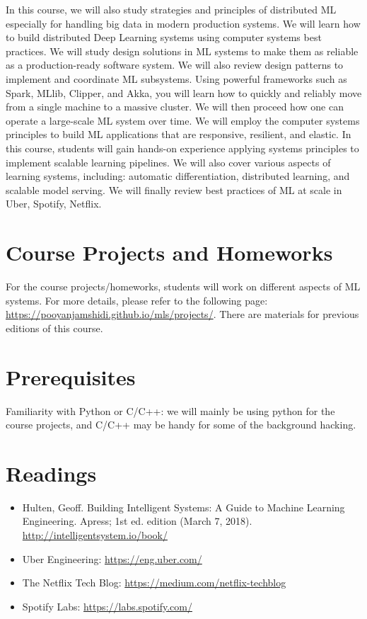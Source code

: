 \documentclass[11pt]{article}
\begin{document}
In this course, we will also study strategies and principles of distributed ML especially for handling big data in modern production systems. We will learn how to build distributed Deep Learning systems using computer systems best practices. We will study design solutions in ML systems to make them as reliable as a production-ready software system. We will also review design patterns to implement and coordinate ML subsystems. Using powerful frameworks such as Spark, MLlib, Clipper, and Akka, you will learn how to quickly and reliably move from a single machine to a massive cluster. We will then proceed how one can operate a large-scale ML system over time. We will employ the computer systems principles to build ML applications that are responsive, resilient, and elastic. In this course, students will gain hands-on experience applying systems principles to implement scalable learning pipelines. We will also cover various aspects of learning systems, including: automatic differentiation, distributed learning, and scalable model serving. We will finally review best practices of ML at scale in Uber, Spotify, Netflix. 


\section*{Course Projects and Homeworks}

For the course projects/homeworks, students will work on different aspects of ML systems. For more details, please refer to the following page: \url{https://pooyanjamshidi.github.io/mls/projects/}. There are materials for previous editions of this course.

\section*{Prerequisites}

Familiarity with Python or C/C++: we will mainly be using python for the course projects, and C/C++ may be handy for some of the background hacking.


\section*{Readings}

\begin{itemize}
\item Hulten, Geoff. Building Intelligent Systems: A Guide to Machine Learning Engineering. Apress; 1st ed. edition (March 7, 2018). \url{http://intelligentsystem.io/book/}
\item Uber Engineering: \url{https://eng.uber.com/}
\item The Netflix Tech Blog: \url{https://medium.com/netflix-techblog}
\item Spotify Labs: \url{https://labs.spotify.com/}
\end{itemize}
\end{document}
